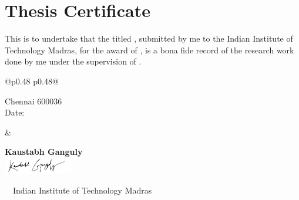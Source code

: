 \chapter*{Thesis Certificate}
This is to undertake that the  titled
{\bfseries\MakeUppercase{}},
submitted by me to the Indian Institute of Technology Madras, for the award of
{\bfseries{}}, is a bona fide
record of the research work done by me under the supervision of
{\bfseries{}}.

\vspace{1.5\parskip}

\begin{tabular}{@{}p{0.48\textwidth} p{0.48\textwidth}@{}}
  \begin{minipage}[t]{\linewidth}
    Chennai 600036 \\
    Date: \textbf{}
  \end{minipage}
  &
  \begin{minipage}[t]{\linewidth}
    \raggedleft
    \textbf{Kaustabh Ganguly} \\
    \vspace{1em}%
    \includegraphics[width=3cm]{images/signature-kaustabh.png}
  \end{minipage}
\end{tabular}



\vspace*{\fill}
\begin{center}
  {\footnotesize
    \textcopyright\
    \
    Indian Institute of Technology Madras
  }
\end{center}

\newpage
